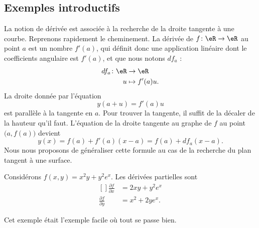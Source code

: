 \subsection{Exemples introductifs}
\label{SEBSECooLPRQooJRQCFL}

La notion de dérivée est associée à la recherche de la droite tangente à une courbe. Reprenons rapidement le cheminement. La dérivée de $f\colon \eR\to \eR$ au point $a$ est un nombre $f'(a)$, qui définit donc une application linéaire dont le coefficients angulaire est $f'(a)$, et que nous notons $df_a$ :
\begin{equation}
    \begin{aligned}
        df_a\colon \eR&\to \eR \\
        u&\mapsto f'(a)u.
    \end{aligned}
\end{equation}
La droite donnée par l'équation
\begin{equation}
    y(a+u)=f'(a)u
\end{equation}
est parallèle à la tangente en $a$. Pour trouver la tangente, il suffit de la décaler de la hauteur qu'il faut. L'équation de la droite tangente au graphe de $f$ au point $\big( a,f(a) \big)$ devient
\begin{equation}        \label{EqDiffRapTgDer}
    y(x)=f(a)+f'(a)(x-a)=f(a)+df_a(x-a).
\end{equation}
Nous nous proposons de généraliser cette formule au cas de la recherche du plan tangent à une surface.

\begin{example}
    Considérons $f(x,y)=x^2y+y^2 e^{x}$. Les dérivées partielles sont
    \begin{equation}
        \begin{aligned}[]
            \frac{ \partial f }{ \partial x }&=2xy+y^2e^x\\
            \frac{ \partial f }{ \partial y }&=x^2+2ye^x.
        \end{aligned}
    \end{equation}
\end{example}

Cet exemple était l'exemple facile où tout se passe bien.

